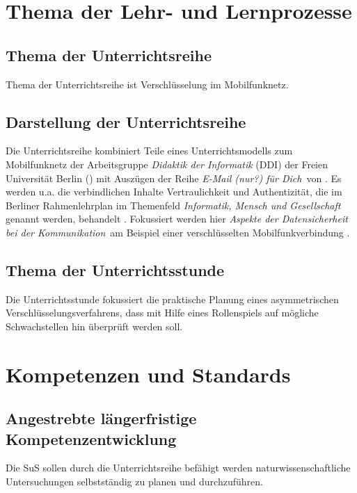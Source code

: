 \section{Thema der Lehr- und Lernprozesse}
\subsection{Thema der Unterrichtsreihe}
Thema der Unterrichtsreihe ist  Verschlüsselung im Mobilfunknetz.
%
\subsection{Darstellung der Unterrichtsreihe}
Die Unterrichtsreihe kombiniert Teile eines Unterrichtsmodells zum Mobilfunknetz der Arbeitsgruppe \textit{Didaktik der Informatik} (DDI) der Freien Universität Berlin (\citeyear{agddifreieuniversitatberlin_2015}) mit Auszügen der Reihe \glqq \textit{E-Mail (nur?) für Dich}\grqq\ von \textcite{gramm_2011}. Es werden u.a. die verbindlichen Inhalte Vertraulichkeit und Authentizität, die im Berliner Rahmenlehrplan im Themenfeld \textit{Informatik, Mensch und Gesellschaft} genannt werden, behandelt \parencite[23]{sek_ii}. Fokussiert werden hier \glqq\textit{Aspekte der Datensicherheit bei der Kommunikation}\grqq\ am Beispiel einer verschlüsselten Mobilfunkverbindung \parencite[16]{sek_ii}. 
%
\subsection{Thema der Unterrichtsstunde}
\enlargethispage{1cm}
Die Unterrichtsstunde fokussiert die praktische Planung eines asymmetrischen Ver\-schlüs\-sel\-ungs\-ver\-fahr\-ens, dass mit Hilfe eines Rollenspiels auf mögliche Schwachstellen hin überprüft werden soll. 
%
%
%
\section{Kompetenzen und Standards}
\subsection{Angestrebte längerfristige Kompetenzentwicklung}
Die SuS sollen durch die Unterrichtsreihe befähigt werden naturwissenschaftliche Untersuchungen selbstständig zu planen und durchzuführen. 


